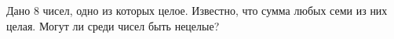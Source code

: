 
Дано $8$ чисел, одно из которых целое. 
	Известно, что сумма любых семи из них целая.
	Могут ли среди чисел быть нецелые?